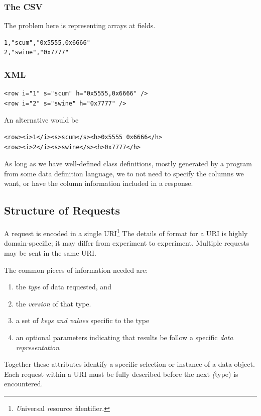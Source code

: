 \subsubsection{The CSV}
The problem here is representing arrays at fields. 
\begin{verbatim}
1,"scum","0x5555,0x6666"
2,"swine","0x7777"
\end{verbatim}

\subsubsection{XML}
\begin{verbatim}
<row i="1" s="scum" h="0x5555,0x6666" />
<row i="2" s="swine" h="0x7777" />
\end{verbatim}

An alternative would be
\begin{verbatim}
<row><i>1</i><s>scum</s><h>0x5555 0x6666</h>
<row><i>2</i><s>swine</s><h>0x7777</h>
\end{verbatim}

As long as we have well-defined class definitions, mostly generated by
a program from some data definition language, we to not need to specify
the columns we want, or have the column information included in a 
response.

\subsection{Structure of Requests}

A request is encoded in a single URI\footnote{\textit{U}niversal
\textit{r}esource \textit{i}dentifier.} The details of format for a URI
is highly domain-specific; it may differ from experiment to experiment.
Multiple requests may be sent in the same URI.

The common pieces of information needed are:

\begin{enumerate}
\item the \emph{type} of data requested, and
\item the \emph{version} of that type.
\item a set of \emph{keys and values} specific to the type
\item an optional parameters indicating that results be
follow a specific \emph{data representation}
\end{enumerate}

Together these attributes identify a specific selection or instance
of a data object.  Each request within a URI must be fully described
before the next \emph(type) is encountered.

